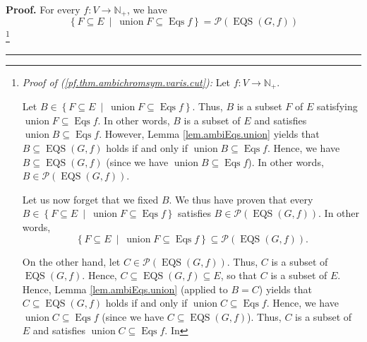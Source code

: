 \documentclass[numbers=enddot,12pt,final,onecolumn,notitlepage]{scrartcl}%
\theoremstyle{definition}
\newenvironment{proof}[1][Proof]{\noindent\textbf{#1.} }{\ \rule{0.5em}{0.5em}}
\newenvironment{verlong}{}{}
\begin{document}
\begin{verlong}
\begin{proof}
For every $f:V\rightarrow\mathbb{N}_{+}$, we have%
\begin{equation}
\left\{  F\subseteq E\ \mid\ \operatorname*{union}F\subseteq
\operatorname*{Eqs}f\right\}  =\mathcal{P}\left(  \operatorname*{EQS}\left(
G,f\right)  \right)  \label{pf.thm.ambichromsym.varis.cut}%
\end{equation}
\footnote{\textit{Proof of (\ref{pf.thm.ambichromsym.varis.cut}):} Let
$f:V\rightarrow\mathbb{N}_{+}$.
\par
Let $B\in\left\{  F\subseteq E\ \mid\ \operatorname*{union}F\subseteq
\operatorname*{Eqs}f\right\}  $. Thus, $B$ is a subset $F$ of $E$ satisfying
$\operatorname*{union}F\subseteq\operatorname*{Eqs}f$. In other words, $B$ is
a subset of $E$ and satisfies $\operatorname*{union}B\subseteq
\operatorname*{Eqs}f$. However, Lemma \ref{lem.ambiEqs.union} yields that
$B\subseteq\operatorname*{EQS}\left(  G,f\right)  $ holds if and only if
$\operatorname*{union}B\subseteq\operatorname*{Eqs}f$. Hence, we have
$B\subseteq\operatorname*{EQS}\left(  G,f\right)  $ (since we have
$\operatorname*{union}B\subseteq\operatorname*{Eqs}f$). In other words,
$B\in\mathcal{P}\left(  \operatorname*{EQS}\left(  G,f\right)  \right)  $.
\par
Let us now forget that we fixed $B$. We thus have proven that every
$B\in\left\{  F\subseteq E\ \mid\ \operatorname*{union}F\subseteq
\operatorname*{Eqs}f\right\}  $ satisfies $B\in\mathcal{P}\left(
\operatorname*{EQS}\left(  G,f\right)  \right)  $. In other words,%
\begin{equation}
\left\{  F\subseteq E\ \mid\ \operatorname*{union}F\subseteq
\operatorname*{Eqs}f\right\}  \subseteq\mathcal{P}\left(  \operatorname*{EQS}%
\left(  G,f\right)  \right)  . \label{pf.thm.ambichromsym.varis.cut.pf.1}%
\end{equation}
\par
On the other hand, let $C\in\mathcal{P}\left(  \operatorname*{EQS}\left(
G,f\right)  \right)  $. Thus, $C$ is a subset of $\operatorname*{EQS}\left(
G,f\right)  $. Hence, $C\subseteq\operatorname*{EQS}\left(  G,f\right)
\subseteq E$, so that $C$ is a subset of $E$. Hence, Lemma
\ref{lem.ambiEqs.union} (applied to $B=C$) yields that $C\subseteq
\operatorname*{EQS}\left(  G,f\right)  $ holds if and only if
$\operatorname*{union}C\subseteq\operatorname*{Eqs}f$. Hence, we have
$\operatorname*{union}C\subseteq\operatorname*{Eqs}f$ (since we have
$C\subseteq\operatorname*{EQS}\left(  G,f\right)  $). Thus, $C$ is a subset of
$E$ and satisfies $\operatorname*{union}C\subseteq\operatorname*{Eqs}f$. In
}
\end{proof}
\end{verlong}
\end{document}
